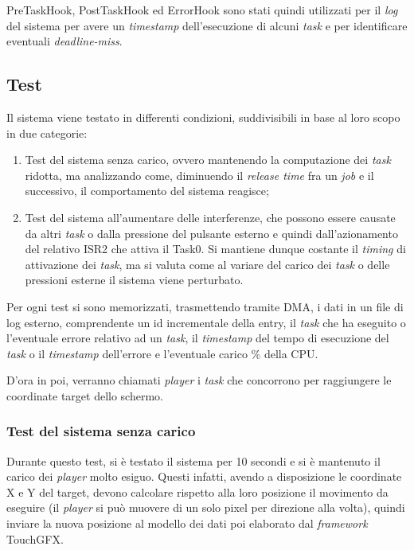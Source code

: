 \documentclass{article}
\begin{document}
PreTaskHook, PostTaskHook ed ErrorHook sono stati quindi utilizzati per il \textit{log} del sistema per avere un \textit{\textit{timestamp}} dell'esecuzione di alcuni \textit{task} e per identificare eventuali \textit{deadline-miss}.

\subsection{Test}
Il sistema viene testato in differenti condizioni, suddivisibili in base al loro scopo in due categorie:
\begin{enumerate}
	\item Test del sistema senza carico, ovvero mantenendo la computazione dei \textit{task} ridotta, ma analizzando come, diminuendo il \textit{release time} fra un \textit{job} e il successivo, il comportamento del sistema reagisce;
	\item Test del sistema all'aumentare delle interferenze, che possono essere causate da altri \textit{task} o dalla pressione del pulsante esterno e quindi dall'azionamento del relativo ISR2 che attiva il Task0. Si mantiene dunque costante il \textit{timing} di attivazione dei \textit{task}, ma si valuta come al variare del carico dei \textit{task} o delle pressioni esterne il sistema viene perturbato.
\end{enumerate}
Per ogni test si sono memorizzati, trasmettendo tramite DMA, i dati in un file di log esterno, comprendente un id incrementale della entry, il \textit{task} che ha eseguito o l'eventuale errore relativo ad un \textit{task}, il \textit{timestamp} del tempo di esecuzione del \textit{task} o il \textit{timestamp} dell'errore e l'eventuale carico \% della CPU.

D'ora in poi, verranno chiamati \textit{player} i \textit{task} che concorrono per raggiungere le coordinate target dello schermo.
\subsubsection{Test del sistema senza carico}
Durante questo test, si è testato il sistema per 10 secondi e si è mantenuto il carico dei \textit{player} molto esiguo. Questi infatti, avendo a disposizione le coordinate X e Y del target, devono calcolare rispetto alla loro posizione il movimento da eseguire (il \textit{player} si può muovere di un solo pixel per direzione alla volta), quindi inviare la nuova posizione al modello dei dati poi elaborato dal \textit{framework} TouchGFX.
\end{document}
